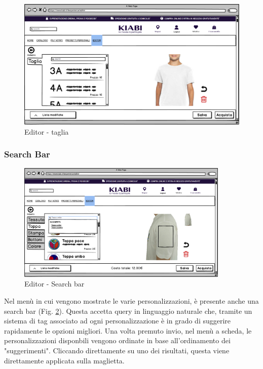 \documentclass[12pt,italian,]{report}
\begin{document}
\begin{figure}[h]
\centering
\includegraphics{../../balsamiq/balsamiq_finale/Editor-caratteristicacapotaglia.png}
\caption{Editor - taglia}
\label{editor_taglia}
\end{figure}

\newpage
\subsubsection{Search Bar}

\begin{figure}[h]
\centering
\includegraphics[width=0.9\textwidth]{../../balsamiq/balsamiq_finale/Editor-caratteristicamanichetopparicerca.png}
\caption{Editor - Search bar}
\label{searchbar}
\end{figure}

Nel menù in cui vengono mostrate le varie personalizzazioni, è presente anche una search bar (Fig. \ref{searchbar}). Questa accetta query in linguaggio naturale che, tramite un sistema di tag associato ad ogni personalizzazione è in grado di suggerire rapidamente le opzioni migliori.
Una volta premuto invio, nel menù a scheda, le personalizzazioni disponbili vengono ordinate in base all'ordinamento dei "suggerimenti". Cliccando direttamente su uno dei risultati, questa viene direttamente applicata sulla maglietta.
\end{document}
